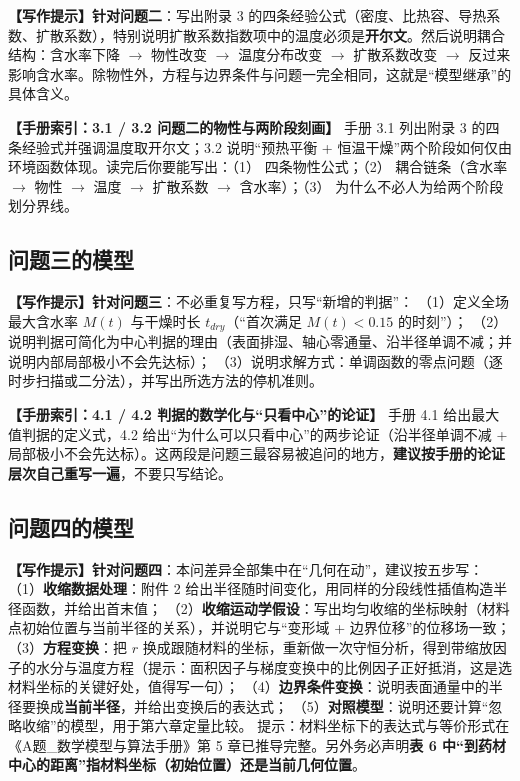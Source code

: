 \documentclass[12pt,a4paper]{article}
\newcommand{\prompt}[1]{\par\noindent\textbf{【写作提示】}#1\par}      %
\newcommand{\handbook}[2]{\par\noindent\textbf{【手册索引：#1】} #2\par}
\begin{document}
\prompt{\textbf{针对问题二}：写出附录 3 的四条经验公式（密度、比热容、导热系数、扩散系数），特别说明扩散系数指数项中的温度必须是\textbf{开尔文}。然后说明耦合结构：含水率下降 $\rightarrow$ 物性改变 $\rightarrow$ 温度分布改变 $\rightarrow$ 扩散系数改变 $\rightarrow$ 反过来影响含水率。除物性外，方程与边界条件与问题一完全相同，这就是“模型继承”的具体含义。}

\handbook{3.1 / 3.2 问题二的物性与两阶段刻画}{手册 3.1 列出附录 3 的四条经验式并强调温度取开尔文；3.2 说明“预热平衡 + 恒温干燥”两个阶段如何仅由环境函数体现。读完后你要能写出：（1） 四条物性公式；（2） 耦合链条（含水率 $\rightarrow$ 物性 $\rightarrow$ 温度 $\rightarrow$ 扩散系数 $\rightarrow$ 含水率）；（3） 为什么不必人为给两个阶段划分界线。}

\subsection{问题三的模型}

\prompt{\textbf{针对问题三}：不必重复写方程，只写“新增的判据”：
（1）定义全场最大含水率 $M(t)$ 与干燥时长 $t_{dry}$（“首次满足 $M(t)<0.15$ 的时刻”）；
（2）说明判据可简化为中心判据的理由（表面排湿、轴心零通量、沿半径单调不减；并说明内部局部极小不会先达标）；
（3）说明求解方式：单调函数的零点问题（逐时步扫描或二分法），并写出所选方法的停机准则。}

\handbook{4.1 / 4.2 判据的数学化与“只看中心”的论证}{手册 4.1 给出最大值判据的定义式，4.2 给出“为什么可以只看中心”的两步论证（沿半径单调不减 + 局部极小不会先达标）。这两段是问题三最容易被追问的地方，\textbf{建议按手册的论证层次自己重写一遍}，不要只写结论。}

\subsection{问题四的模型}

\prompt{\textbf{针对问题四}：本问差异全部集中在“几何在动”，建议按五步写：
（1）\textbf{收缩数据处理}：附件 2 给出半径随时间变化，用同样的分段线性插值构造半径函数，并给出首末值；
（2）\textbf{收缩运动学假设}：写出均匀收缩的坐标映射（材料点初始位置与当前半径的关系），并说明它与“变形域 + 边界位移”的位移场一致；
（3）\textbf{方程变换}：把 $r$ 换成跟随材料的坐标，重新做一次守恒分析，得到带缩放因子的水分与温度方程（提示：面积因子与梯度变换中的比例因子正好抵消，这是选材料坐标的关键好处，值得写一句）；
（4）\textbf{边界条件变换}：说明表面通量中的半径要换成\textbf{当前半径}，并给出变换后的表达式；
（5）\textbf{对照模型}：说明还要计算“忽略收缩”的模型，用于第六章定量比较。
提示：材料坐标下的表达式与等价形式在《A题\_数学模型与算法手册》第 5 章已推导完整。另外务必声明\textbf{表 6 中“到药材中心的距离”指材料坐标（初始位置）还是当前几何位置}。}
\end{document}
